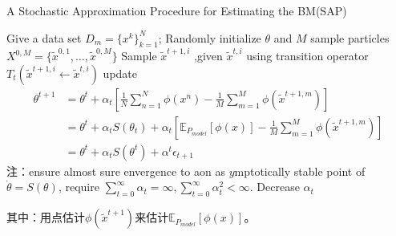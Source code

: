              \begin{algorithm}[h]
                \caption{A Stochastic Approximation Procedure for Estimating the BM(SAP)}\label{code:SAP算法}
                \begin{algorithmic}[1]
                    \State Give a data set $D_m = \{x^k\}_{k=1}^N$; Randomly initialize $\theta$ and $M$ sample particles $X^{0,M}=\{\tilde{ x}^{0,1},\dots,\tilde{x}^{0,M}\}$
                            \State Sample $\tilde{ x}^{t+1,i}$ ,given $\tilde{x}^{t,i}$ using transition operator $T_t(\tilde{ x}^{t+1,i} \leftarrow \tilde{ x}^{t,i})$
                        \EndFor
                        \State update
                        \begin{align*}
                        \theta^{t+1} & =\theta^t + \alpha_t \left[ \frac{1}{N}\sum_{n=1}^N\phi(x^n) - \frac{1}{M}\sum_{m=1}^M\phi(\tilde{x}^{t+1,m})  \right]\\
                        & =\theta^t + \alpha_t S(\theta_t) + \alpha_t \left[\mathbb{E}_{P_{model}}[\phi(x)] - \frac{1}{M}\sum_{m=1}^M\phi(\tilde{ x}^{t+1,m})\right]\\
                        & =\theta^t + \alpha_t S(\theta^t)+\alpha^t\epsilon_{t+1}
                        \end{align*}
                        注：ensure almost sure envergence to aon as $y$mptotically stable point of $\dot{\theta} = S(\theta)$, require $\sum_{t=0}^\infty \alpha_t = \infty,\sum_{t=0}^\infty \alpha_t^2 < \infty$.
                        \State Decrease $\alpha_t$
                    \EndFor
                \end{algorithmic}
            \end{algorithm}
            其中：用点估计$\phi(\tilde{x}^{t+1})$来估计$\mathbb{E}_{P_{model}}[\phi(x)]$。

